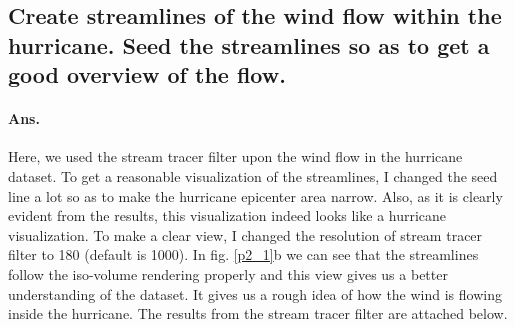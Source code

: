 \documentclass[a4paper,11pt]{article}
\theoremstyle{mytheor}
\begin{document}
\subsection{Create streamlines of the wind flow within the hurricane. Seed the streamlines so as to
get a good overview of the flow.}
\paragraph{Ans.} Here, we used the stream tracer filter upon the wind flow in the hurricane dataset. To get a reasonable visualization of the streamlines, I changed the seed line a lot so as to make the hurricane epicenter area narrow. Also, as it is clearly evident from the results, this visualization indeed looks like a hurricane visualization. To make a clear view, I changed the resolution of stream tracer filter to 180 (default is 1000). In fig. \ref{p2_1}b we can see that the streamlines follow the iso-volume rendering properly and this view gives us a better understanding of the dataset. It gives us a rough idea of how the wind is flowing inside the hurricane. The results from the stream tracer filter are attached below. 
\end{document}
